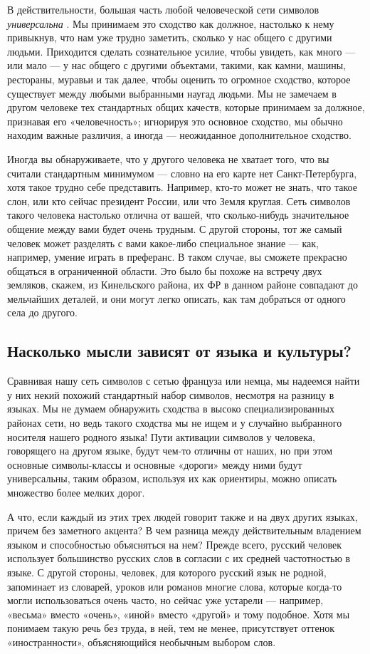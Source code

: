 \documentclass[../main.tex]{subfiles}
\begin{document}
В действительности, большая часть любой человеческой сети символов \emph{универсальна} . Мы принимаем это сходство как должное, настолько к нему привыкнув, что нам уже трудно заметить, сколько у нас общего с другими людьми. Приходится сделать сознательное усилие, чтобы увидеть, как много --- или мало --- у нас общего с другими объектами, такими, как камни, машины, рестораны, муравьи и так далее, чтобы оценить то огромное сходство, которое существует между любыми выбранными наугад людьми. Мы не замечаем в другом человеке тех стандартных общих качеств, которые принимаем за должное, признавая его «человечность»; игнорируя это основное сходство, мы обычно находим важные различия, а иногда --- неожиданное дополнительное сходство.

Иногда вы обнаруживаете, что у другого человека не хватает того, что вы считали стандартным минимумом --- словно на его карте нет Санкт-Петербурга, хотя такое трудно себе представить. Например, кто-то может не знать, что такое слон, или кто сейчас президент России, или что Земля круглая. Сеть символов такого человека настолько отлична от вашей, что сколько-нибудь значительное общение между вами будет очень трудным. С другой стороны, тот же самый человек может разделять с вами какое-либо специальное знание --- как, например, умение играть в преферанс. В таком случае, вы сможете прекрасно общаться в ограниченной области. Это было бы похоже на встречу двух земляков, скажем, из Кинельского района, их ФР в данном районе совпадают до мельчайших деталей, и они могут легко описать, как там добраться от одного села до другого.


\subsection{Насколько мысли зависят от языка и культуры?}

Сравнивая нашу сеть символов с сетью француза или немца, мы надеемся найти у них некий похожий стандартный набор символов, несмотря на разницу в языках. Мы не думаем обнаружить сходства в высоко специализированных районах сети, но ведь такого сходства мы не ищем и у случайно выбранного носителя нашего родного языка! Пути активации символов у человека, говорящего на другом языке, будут чем-то отличны от наших, но при этом основные символы-классы и основные «дороги» между ними будут универсальны, таким образом, используя их как ориентиры, можно описать множество более мелких дорог.

А что, если каждый из этих трех людей говорит также и на двух других языках, причем без заметного акцента? В чем разница между действительным владением языком и способностью объясняться на нем? Прежде всего, русский человек использует большинство русских слов в согласии с их средней частотностью в языке. С другой стороны, человек, для которого русский язык не родной, запоминает из словарей, уроков или романов многие слова, которые когда-то могли использоваться очень часто, но сейчас уже устарели --- например, «весьма» вместо «очень», «иной» вместо «другой» и тому подобное. Хотя мы понимаем такую речь без труда, в ней, тем не менее, присутствует оттенок «иностранности», объясняющийся необычным выбором слов.
\end{document}
